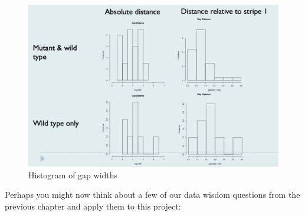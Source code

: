 \begin{figure}[H]
\begin{center}
\includegraphics[scale=0.25]{gap_width.jpg}
\end{center}
\caption{Histogram of gap widths}
\label{fig:gap_widths}
\end{figure}



Perhaps you might now think about a few of our data wisdom questions from the previous chapter and apply them to this project:

